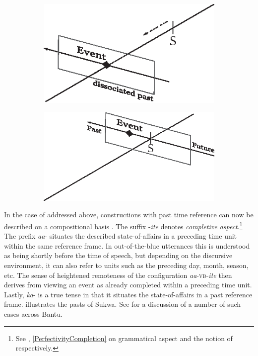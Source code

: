 \begin{figure}[h]
\begin{center}
\caption{Dissociative and associative pasts}
\label{FigureConstrualsOfPast}
\begin{subfigure}[h]{0.45\textwidth}
\includegraphics{figures/GrafikPastDDomainNew.eps}
\label{PastDDomain}
\end{subfigure}
\begin{subfigure}[h]{0.45\textwidth}
\includegraphics{figures/GrafikPastPDomainNew.eps}
\label{PastPDomain}
\end{subfigure}
\end{center}
\end{figure}
\largerpage
In the case of  addressed above, constructions with past time reference can now be described on a compositional basis \citep{KershnerT2002}. The suffix \mbox{-\textit{ite}} denotes \textit{completive aspect}.\footnote{See , \ref{PerfectivityCompletion} on grammatical aspect and the notion of  respectively.} The prefix \textit{aa}- situates the described state-of-affairs in a preceding time unit within the same reference frame. In out-of-the-blue utterances this is understood as being shortly before the time of speech, but depending on the discursive environment, it can also refer to units such as the preceding day, month, season, etc.
The sense of heightened remoteness of the configuration \mbox{\textit{aa}-}\textsc{vb}\mbox{-\textit{ite}} then derives from viewing an event as already completed within a preceding time unit. Lastly, \textit{ka}- is a true tense in that it situates the state-of-affairs in a past reference frame.  illustrates the pasts of Sukwa. See \citet{BotneRKershnerT2008} for a discussion of a number of such cases across Bantu.

